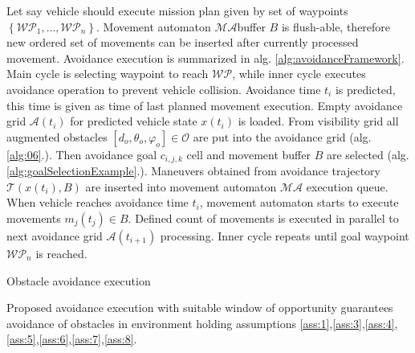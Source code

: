 Let say vehicle should execute mission plan given by set of waypoints $\left\{\mathscr{WP}_1,\dots,\mathscr{WP}_{n}\right\}$. Movement automaton $\mathscr{MA} $buffer $B$ is flush-able, therefore new ordered set of movements can be inserted after currently processed movement. Avoidance execution is summarized in alg. \ref{alg:avoidanceFramework}. Main cycle is selecting waypoint to reach $\mathscr{WP}$, while inner cycle executes avoidance operation to prevent vehicle collision. Avoidance time $t_i$ is predicted, this time is given as time of last planned movement execution. Empty avoidance grid $\mathscr{A}(t_i)$ for predicted vehicle state $x(t_i)$ is loaded. From visibility grid all augmented obstacles $[d_o,\theta_o,\varphi_o]\in\mathscr{O}$ are put into the avoidance grid (alg. \ref{alg:06}.). Then avoidance goal $c_{i,j,k}$ cell and movement buffer $B$ are selected (alg. \ref{alg:goalSelectionExample}.). Maneuvers obtained from avoidance trajectory $\mathscr{T}(x(t_i),B)$ are inserted into movement automaton $\mathscr{MA}$ execution queue. When vehicle reaches avoidance time $t_i$, movement automaton starts to execute movements $m_j(t_j)\in B$. Defined count of movements is executed in parallel to next avoidance grid $\mathscr{A}(t_{i+1})$ processing. Inner cycle repeats until goal waypoint $\mathscr{WP}_n$ is reached.
\\
\begin{algorithm}[H]
    \label{alg:avoidanceFramework}
    \caption{Obstacle avoidance execution}
\end{algorithm}
Proposed avoidance execution with suitable window of opportunity guarantees avoidance of obstacles in environment holding assumptions \ref{ass:1},\ref{ass:3},\ref{ass:4},\ref{ass:5},\ref{ass:6},\ref{ass:7},\ref{ass:8}.